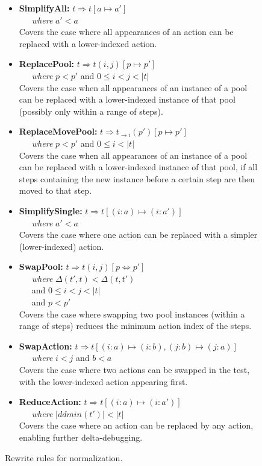 \begin{figure}[t]
{\scriptsize
\begin{itemize}
\item {\bf SimplifyAll:}
$t \Rightarrow t[a \mapsto a']$\\
\-\ \ \ \emph{where} $a' < a$\\
Covers the case where all appearances of an action can be replaced with a 
lower-indexed action. 
\item {\bf ReplacePool:}
$t \Rightarrow t(i,j)[p \mapsto p']$\\ 
\-\ \ \ \emph{where} $p < p'$ and $0 \leq i < j <
|t|$\\
Covers the case when all appearances of an instance of a pool can be replaced with 
a lower-indexed instance of that pool (possibly only within a range of steps).
\item {\bf ReplaceMovePool:}
$t \Rightarrow t_{\rightarrow i}(p')[p \mapsto p']$\\
\-\ \ \ \emph{where} $p < p'$ and $0
\leq i < |t|$\\
Covers the case when all appearances of an instance of a pool can be replaced with
a lower-indexed instance of that pool, if all steps containing the new instance before a
certain step are then moved to that step.
\item {\bf SimplifySingle:}
$t \Rightarrow t[(i: a) \mapsto (i: a')]$\\
\-\ \ \ \emph{where} $a' < a$\\
Covers the case where one action can be replaced with a 
simpler (lower-indexed) action. 
\item {\bf SwapPool:}
$t \Rightarrow t(i,j)[p \Leftrightarrow p']$\\
\-\ \ \ \emph{where} $\Delta(t',t) < \Delta(t,t')$\\
\-\ \ \ and $0 \leq i < j < |t|$\\
\-\ \ \ and $p < p'$\\
Covers the case where swapping two pool instances (within a range of steps) reduces
the minimum action index of the steps.
\item {\bf SwapAction:}
$t \Rightarrow t[(i: a) \mapsto (i: b), (j: b) \mapsto (j: a)]$\\
\-\ \ \ \emph{where} $i < j$ and
$b < a$\\
Covers the case where two actions can be swapped in the test, with the
lower-indexed action appearing first.
\item {\bf ReduceAction:}
$t \Rightarrow t[(i: a) \mapsto (i: a')]$\\
\-\ \ \ \emph{where} $|ddmin(t')| < |t|$\\
Covers the case where an action can be replaced by any action, enabling further delta-debugging.
\end{itemize}
}
\caption{Rewrite rules for normalization.}
\label{fig:rewrite}
\end{figure}

